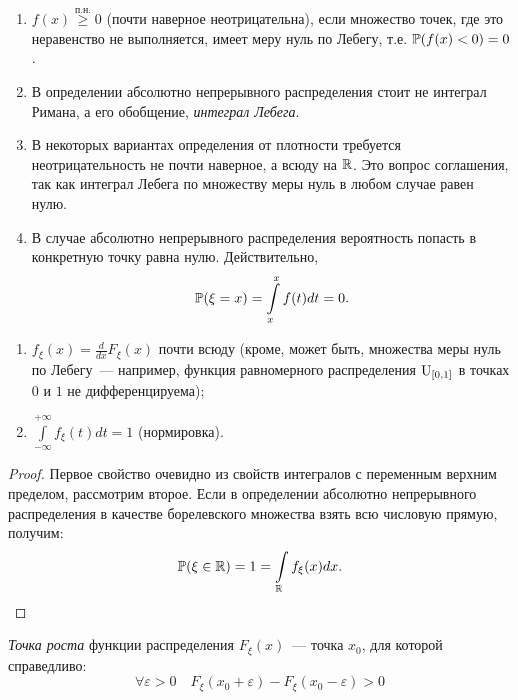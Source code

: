 \begin{rmrk}
\begin{enumerate}\leavevmode
    \item 
        $f(x) \overset{\text{п.н.}}{\geqslant} 0$ (почти наверное неотрицательна), если множество точек, где это неравенство не выполняется, имеет меру нуль по Лебегу, т.е. $\operatorname{\mathbb{P}}(f(x) < 0) = 0$.
    \item 
        В определении абсолютно непрерывного распределения стоит не интеграл Римана, а его обобщение, \textit{интеграл Лебега}.
    \item 
        В некоторых вариантах определения от плотности требуется неотрицательность не почти наверное, а всюду на $\mathbb{R}$. 
        Это вопрос соглашения, так как интеграл Лебега по множеству меры нуль в любом случае равен нулю.
    \item 
        В случае абсолютно непрерывного распределения вероятность попасть в конкретную точку равна нулю. Действительно,
        \begin{equation*}
            \operatorname{\mathbb{P}}(\xi = x) = \int\limits_{x}^{x} f(t)dt = 0.
        \end{equation*}
\end{enumerate}
\end{rmrk}

\begin{namedthm}\leavevmode
\begin{enumerate}
    \item $f_{\xi}(x) = \frac{d}{dx}F_{\xi}(x)$ почти всюду (кроме, может быть, множества меры нуль по Лебегу~--- например, функция равномерного распределения $\operatorname{\mathrm{U}}_{[0, 1]}$ в точках $0$ и $1$ не дифференцируема);
    \item $\int\limits_{-\infty}^{+\infty} f_\xi(t)dt = 1$ (нормировка).
\end{enumerate}
\end{namedthm}
\begin{proof}
    Первое свойство очевидно из свойств интегралов с переменным верхним пределом, рассмотрим второе.
    Если в определении абсолютно непрерывного распределения в качестве борелевского множества взять всю числовую прямую, получим:
    \begin{equation*}
        \operatorname{\mathbb{P}}(\xi \in \mathbb{R})=1=\int\limits_{\mathbb{R}} f_{\xi}(x)dx. \qedhere
    \end{equation*}
\end{proof}

\begin{defn}
    \textit{Точка роста} функции распределения $F_\xi(x)$~--- точка $x_0$, для которой справедливо:
\begin{equation*}
    \forall \varepsilon > 0 \quad F_\xi(x_0 + \varepsilon) - F_\xi(x_0 - \varepsilon) > 0
\end{equation*}
\end{defn}


